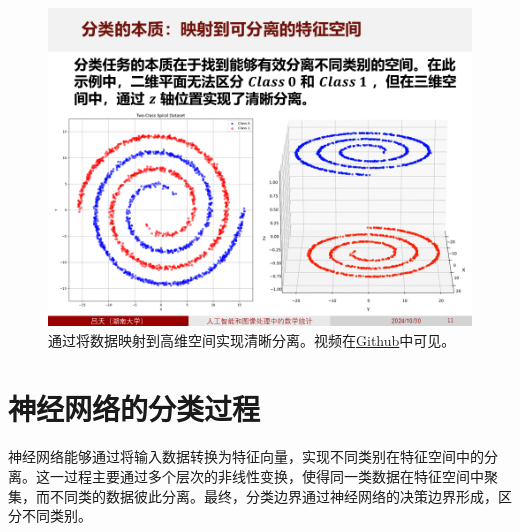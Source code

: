 \documentclass[
    report,     %
    oneside,    %
    UTF8,       %
    zihao=-4    %
]{config} %
\begin{document}
\begin{figure}[H]
    \centering
    \includegraphics[width=\linewidth]{figures/神经网络分类的原理与实现/1.PNG}
    \caption[通过将数据映射到高维空间实现清晰分离]{通过将数据映射到高维空间实现清晰分离。视频在\href{https://github.com/PhD-TianLv/Mathematical-Statistics-in-Artificial-Intelligence-and-Image-Processing/blob/main/videos/3-分类的本质：映射到可分离的特征空间.mp4}{Github}\footnotemark 中可见。}
\end{figure}


\section{神经网络的分类过程}

神经网络能够通过将输入数据转换为特征向量，实现不同类别在特征空间中的分离。这一过程主要通过多个层次的非线性变换，使得同一类数据在特征空间中聚集，而不同类的数据彼此分离。最终，分类边界通过神经网络的决策边界形成，区分不同类别。
\end{document}
